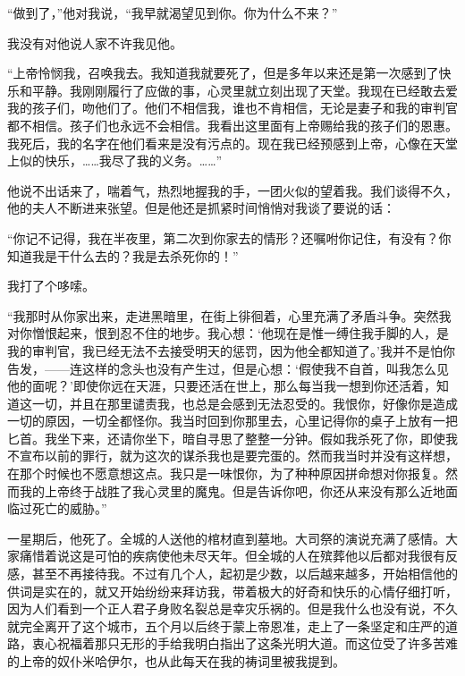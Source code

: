 \par “做到了，”他对我说，“我早就渴望见到你。你为什么不来？”
\par 我没有对他说人家不许我见他。
\par “上帝怜悯我，召唤我去。我知道我就要死了，但是多年以来还是第一次感到了快乐和平静。我刚刚履行了应做的事，心灵里就立刻出现了天堂。我现在已经敢去爱我的孩子们，吻他们了。他们不相信我，谁也不肯相信，无论是妻子和我的审判官都不相信。孩子们也永远不会相信。我看出这里面有上帝赐给我的孩子们的恩惠。我死后，我的名字在他们看来是没有污点的。现在我已经预感到上帝，心像在天堂上似的快乐，……我尽了我的义务。……”
\par 他说不出话来了，喘着气，热烈地握我的手，一团火似的望着我。我们谈得不久，他的夫人不断进来张望。但是他还是抓紧时间悄悄对我谈了要说的话：
\par “你记不记得，我在半夜里，第二次到你家去的情形？还嘱咐你记住，有没有？你知道我是干什么去的？我是去杀死你的！”
\par 我打了个哆嗦。
\par “我那时从你家出来，走进黑暗里，在街上徘徊着，心里充满了矛盾斗争。突然我对你憎恨起来，恨到忍不住的地步。我心想：‘他现在是惟一缚住我手脚的人，是我的审判官，我已经无法不去接受明天的惩罚，因为他全都知道了。’我并不是怕你告发，——连这样的念头也没有产生过，但是心想：‘假使我不自首，叫我怎么见他的面呢？’即使你远在天涯，只要还活在世上，那么每当我一想到你还活着，知道这一切，并且在那里谴责我，也总是会感到无法忍受的。我恨你，好像你是造成一切的原因，一切全都怪你。我当时回到你那里去，心里记得你的桌子上放有一把匕首。我坐下来，还请你坐下，暗自寻思了整整一分钟。假如我杀死了你，即使我不宣布以前的罪行，就为这次的谋杀我也是要完蛋的。然而我当时并没有这样想，在那个时候也不愿意想这点。我只是一味恨你，为了种种原因拼命想对你报复。然而我的上帝终于战胜了我心灵里的魔鬼。但是告诉你吧，你还从来没有那么近地面临过死亡的威胁。”
\par 一星期后，他死了。全城的人送他的棺材直到墓地。大司祭的演说充满了感情。大家痛惜着说这是可怕的疾病使他未尽天年。但全城的人在殡葬他以后都对我很有反感，甚至不再接待我。不过有几个人，起初是少数，以后越来越多，开始相信他的供词是实在的，就又开始纷纷来拜访我，带着极大的好奇和快乐的心情仔细打听，因为人们看到一个正人君子身败名裂总是幸灾乐祸的。但是我什么也没有说，不久就完全离开了这个城市，五个月以后终于蒙上帝恩准，走上了一条坚定和庄严的道路，衷心祝福着那只无形的手给我明白指出了这条光明大道。而这位受了许多苦难的上帝的奴仆米哈伊尔，也从此每天在我的祷词里被我提到。
